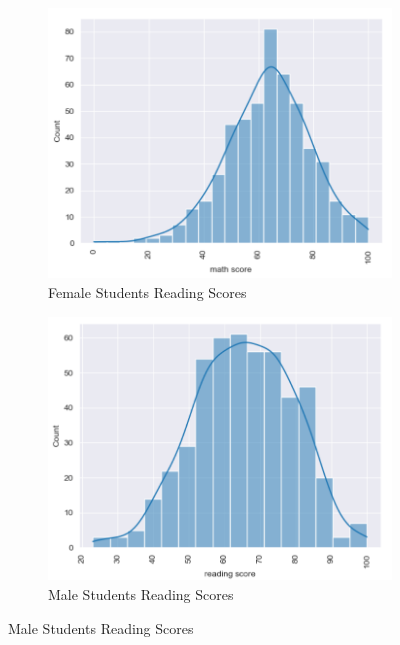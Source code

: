 \documentclass[doc]{apa6} %
\begin{document}
\begin{figure}[H]
    \centering
    \caption{Reading Standardized Scores by Gender}
    \begin{subfigure}[b]{0.45\textwidth}
        \includegraphics[width=\linewidth]{FemaleStudentsMathScoreCurve.png}
        \caption{Female Students Reading Scores}
        \label{fig:FemaleRead}
    \end{subfigure}
    \begin{subfigure}[b]{0.45\textwidth}
        \includegraphics[width=\linewidth]{MaleStudentReadingScoreCurve.png}
        \caption{Male Students Reading Scores}
        \label{fig:MaleRead}
    \end{subfigure}
\end{figure}
\end{document}
